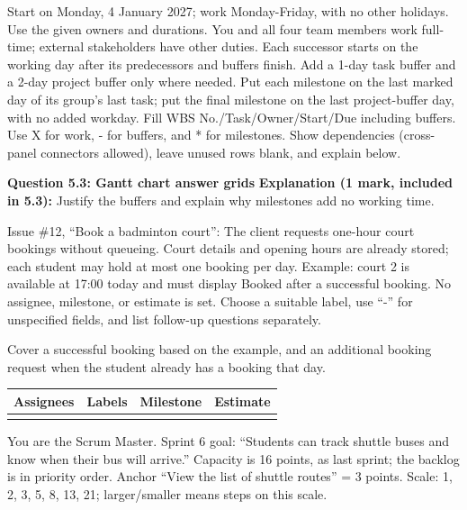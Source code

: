\newpage
{}
Start on Monday, 4 January 2027; work Monday-Friday, with no other holidays. Use the given owners and durations. You and all four team members work full-time; external stakeholders have other duties. Each successor starts on the working day after its predecessors and buffers finish. Add a 1-day task buffer and a 2-day project buffer only where needed. Put each milestone on the last marked day of its group's last task; put the final milestone on the last project-buffer day, with no added workday. Fill WBS No./Task/Owner/Start/Due including buffers. Use X for work, - for buffers, and * for milestones. Show dependencies (cross-panel connectors allowed), leave unused rows blank, and explain below.\par
\textbf{Question 5.3: Gantt chart answer grids}
\textbf{Explanation (1 mark, included in 5.3):} Justify the buffers and explain why milestones add no working time.\par
\blankbox{2.2cm}
\newpage
{}
Issue \#12, ``Book a badminton court'': The client requests one-hour court bookings without queueing. Court details and opening hours are already stored; each student may hold at most one booking per day. Example: court 2 is available at 17:00 today and must display Booked after a successful booking. No assignee, milestone, or estimate is set. Choose a suitable label, use ``-'' for unspecified fields, and list follow-up questions separately.\par
{}
\blankbox{1.8cm}
\blankbox{2.3cm}
Cover a successful booking based on the example, and an additional booking request when the student already has a booking that day.\par
\blankbox{3.2cm}
\blankbox{3.2cm}
\begin{tabularx}{\linewidth}{|Y|Y|Y|Y|}\hline
Assignees & Labels & Milestone & Estimate\\\hline
\rule{0pt}{4cm}&&&\\\hline
\end{tabularx}
\newpage
{}
You are the Scrum Master. Sprint 6 goal: ``Students can track shuttle buses and know when their bus will arrive.'' Capacity is 16 points, as last sprint; the backlog is in priority order. Anchor ``View the list of shuttle routes'' = 3 points. Scale: 1, 2, 3, 5, 8, 13, 21; larger/smaller means steps on this scale.\par
